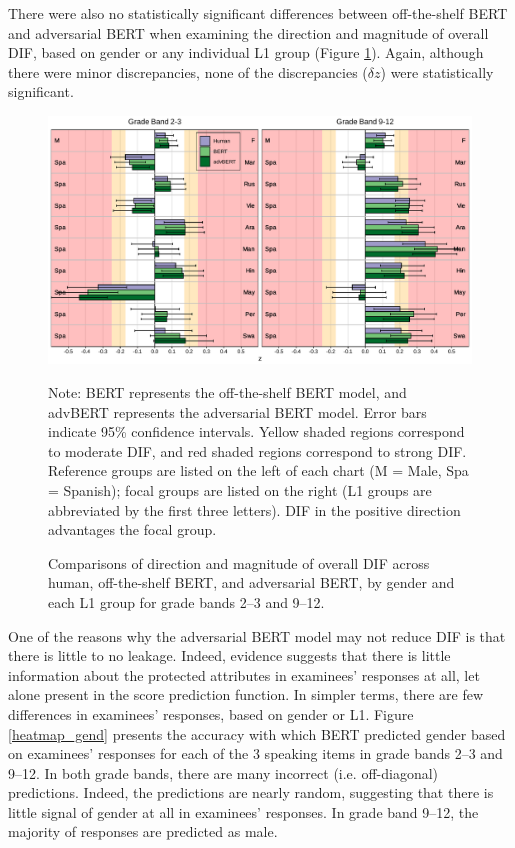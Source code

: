 \documentclass [PhD] {uclathes}
\begin{document}
There were also no statistically significant differences between off-the-shelf BERT and adversarial BERT when examining the direction and magnitude of overall DIF, based on gender or any individual L1 group (Figure \ref{advBERT_z_ovr}). Again, although there were minor discrepancies, none of the discrepancies ($\delta z$) were statistically significant.

\begin{figure}[h]
    \centering
    \caption{Comparisons of direction and magnitude of overall DIF across human, off-the-shelf BERT, and adversarial BERT, by gender and each L1 group for grade bands 2–3 and 9–12.}    
    \includegraphics[width=6.5in]{figures/20230517_ETS-DIF_advBERT_z_ovr_edit.pdf}
    \label{advBERT_z_ovr}
	{\newline Note: BERT represents the off-the-shelf BERT model, and advBERT represents the adversarial BERT model. Error bars indicate 95\% confidence intervals. Yellow shaded regions correspond to moderate DIF, and red shaded regions correspond to strong DIF. Reference groups are listed on the left of each chart (M = Male, Spa = Spanish); focal groups are listed on the right (L1 groups are abbreviated by the first three letters). DIF in the positive direction advantages the focal group. \par}
\end{figure}

One of the reasons why the adversarial BERT model may not reduce DIF is that there is little to no leakage. Indeed, evidence suggests that there is little information about the protected attributes in examinees’ responses at all, let alone present in the score prediction function. In simpler terms, there are few differences in examinees’ responses, based on gender or L1. Figure \ref{heatmap_gend} presents the accuracy with which BERT predicted gender based on examinees’ responses for each of the 3 speaking items in grade bands 2–3 and 9–12. In both grade bands, there are many incorrect (i.e. off-diagonal) predictions. Indeed, the predictions are nearly random, suggesting that there is little signal of gender at all in examinees’ responses. In grade band 9–12, the majority of responses are predicted as male. 
\end{document}
